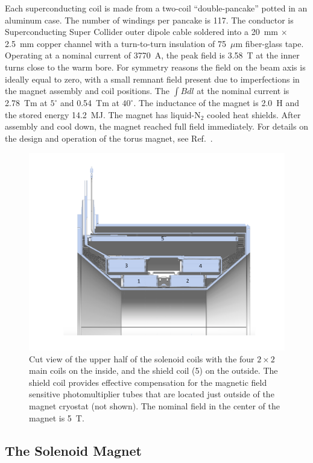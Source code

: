 \documentclass[final,3p,twocolumn]{elsarticle}
\begin{document}
Each superconducting coil is made from a two-coil ``double-pancake'' potted in an aluminum case. The number of
windings per pancake is 117. The conductor is Superconducting Super Collider outer dipole cable soldered into 
a 20~mm $\times$ 2.5~mm
copper channel with a turn-to-turn insulation of 75~$\mu$m fiber-glass tape. Operating at a nominal current of
3770~A, the peak field is 3.58~T at the inner turns close to the warm bore. For symmetry reasons the field on
the beam axis is ideally equal to zero, with a small remnant field present due to imperfections in the magnet
assembly and coil positions. The $\int {Bdl}$ at the nominal current is 2.78~Tm at $5^\circ$ and 0.54~Tm at
$40^\circ$. The inductance of the magnet is 2.0~H and the stored energy 14.2~MJ. The magnet has liquid-N$_2$
cooled heat shields. After assembly and cool down, the magnet reached full field immediately. For details on the
design and operation of the torus magnet, see Ref.~\cite{clas12-magnets}.
\begin{figure}[tb!]
\centerline{\includegraphics[width=1.0\columnwidth]{Solenoid.pdf}}
\caption{Cut view of the upper half of the solenoid coils with the four $2 \times 2$ main coils on the inside, and the
  shield coil (5) on the outside. The shield coil provides effective compensation for the magnetic field sensitive
  photomultiplier tubes that are located just outside of the magnet cryostat (not shown). The nominal field in the
  center of the magnet is 5~T.}
\label{solenoid-coils}
\end{figure}


\subsection{The Solenoid Magnet}
\end{document}
